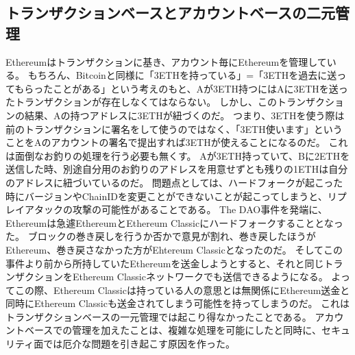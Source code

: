 \subsection{トランザクションベースとアカウントベースの二元管理}
Ethereumはトランザクションに基き、アカウント毎にEthereumを管理している。
もちろん、Bitcoinと同様に「3ETHを持っている」=「3ETHを過去に送ってもらったことがある」という考えのもと、Aが3ETH持つにはAに3ETHを送ったトランザクションが存在しなくてはならない。
しかし、このトランザクションの結果、Aの持つアドレスに3ETHが紐づくのだ。
つまり、3ETHを使う際は前のトランザクションに署名をして使うのではなく、「3ETH使います」ということをAのアカウントの署名で提出すれば3ETHが使えることになるのだ。
これは面倒なお釣りの処理を行う必要も無くす。
Aが3ETH持っていて、Bに2ETHを送信した時、別途自分用のお釣りのアドレスを用意せずとも残りの1ETHは自分のアドレスに紐づいているのだ。
問題点としては、ハードフォークが起こった時にバージョンやChainIDを変更ことができないことが起こってしまうと、リプレイアタックの攻撃の可能性があることである。
The DAO事件を発端に、Ethereumは急遽EthereumとEthereum Classicにハードフォークすることとなった。
ブロックの巻き戻しを行うか否かで意見が割れ、巻き戻したほうがEthereum、巻き戻さなかった方がEhtereum Classicとなったのだ。
そしてこの事件より前から所持していたEthereumを送金しようとすると、それと同じトランザクションをEthereum Classicネットワークでも送信できるようになる。
よってこの際、Ethereum Classicは持っている人の意思とは無関係にEthereum送金と同時にEthereum Classicも送金されてしまう可能性を持ってしまうのだ。
これはトランザクションベースの一元管理では起こり得なかったことである。
アカウントベースでの管理を加えたことは、複雑な処理を可能にしたと同時に、セキュリティ面では厄介な問題を引き起こす原因を作った。

